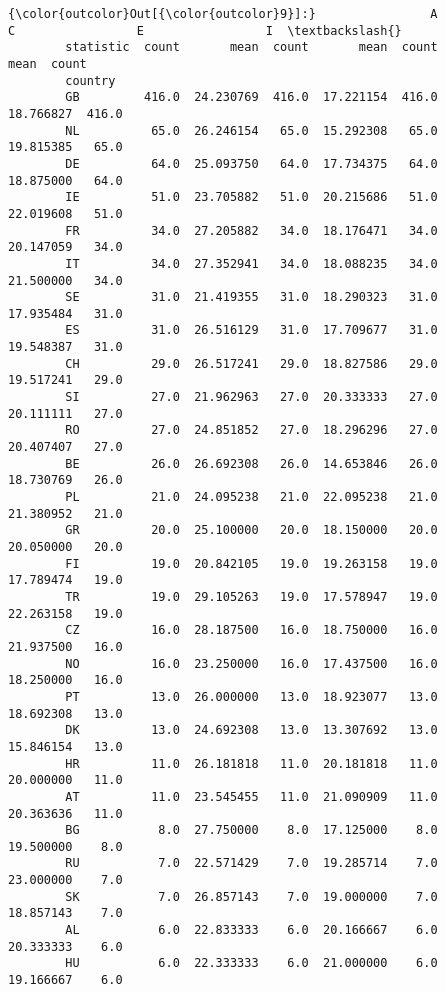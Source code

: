 \documentclass[11pt]{article}
\begin{document}
            \begin{Verbatim}[commandchars=\\\{\}]
{\color{outcolor}Out[{\color{outcolor}9}]:}                A                 C                 E                 I  \textbackslash{}
        statistic  count       mean  count       mean  count       mean  count   
        country                                                                  
        GB         416.0  24.230769  416.0  17.221154  416.0  18.766827  416.0   
        NL          65.0  26.246154   65.0  15.292308   65.0  19.815385   65.0   
        DE          64.0  25.093750   64.0  17.734375   64.0  18.875000   64.0   
        IE          51.0  23.705882   51.0  20.215686   51.0  22.019608   51.0   
        FR          34.0  27.205882   34.0  18.176471   34.0  20.147059   34.0   
        IT          34.0  27.352941   34.0  18.088235   34.0  21.500000   34.0   
        SE          31.0  21.419355   31.0  18.290323   31.0  17.935484   31.0   
        ES          31.0  26.516129   31.0  17.709677   31.0  19.548387   31.0   
        CH          29.0  26.517241   29.0  18.827586   29.0  19.517241   29.0   
        SI          27.0  21.962963   27.0  20.333333   27.0  20.111111   27.0   
        RO          27.0  24.851852   27.0  18.296296   27.0  20.407407   27.0   
        BE          26.0  26.692308   26.0  14.653846   26.0  18.730769   26.0   
        PL          21.0  24.095238   21.0  22.095238   21.0  21.380952   21.0   
        GR          20.0  25.100000   20.0  18.150000   20.0  20.050000   20.0   
        FI          19.0  20.842105   19.0  19.263158   19.0  17.789474   19.0   
        TR          19.0  29.105263   19.0  17.578947   19.0  22.263158   19.0   
        CZ          16.0  28.187500   16.0  18.750000   16.0  21.937500   16.0   
        NO          16.0  23.250000   16.0  17.437500   16.0  18.250000   16.0   
        PT          13.0  26.000000   13.0  18.923077   13.0  18.692308   13.0   
        DK          13.0  24.692308   13.0  13.307692   13.0  15.846154   13.0   
        HR          11.0  26.181818   11.0  20.181818   11.0  20.000000   11.0   
        AT          11.0  23.545455   11.0  21.090909   11.0  20.363636   11.0   
        BG           8.0  27.750000    8.0  17.125000    8.0  19.500000    8.0   
        RU           7.0  22.571429    7.0  19.285714    7.0  23.000000    7.0   
        SK           7.0  26.857143    7.0  19.000000    7.0  18.857143    7.0   
        AL           6.0  22.833333    6.0  20.166667    6.0  20.333333    6.0   
        HU           6.0  22.333333    6.0  21.000000    6.0  19.166667    6.0   

\end{Verbatim}
\end{document}
